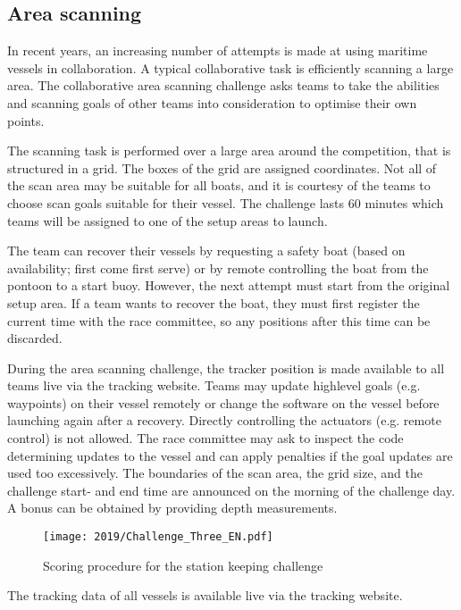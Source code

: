 \documentclass[12pt]{article}
\begin{document}
\subsection{Area scanning}
In recent years, an increasing number of attempts is made at using maritime
vessels in collaboration. A typical
collaborative task is efficiently scanning a large area.
The collaborative area scanning challenge asks teams to take the abilities and
scanning goals of other teams into consideration to optimise their own points.

The scanning task is performed over a large area around the competition, that is
structured in a grid. The boxes of the grid are assigned coordinates. Not all of
the scan area may be suitable for all boats, and it is courtesy of the teams to
choose scan goals suitable for their vessel. The
challenge lasts 60 minutes which teams will be assigned to one of the setup areas
to launch. 

The team can recover their vessels by requesting a safety boat (based on
availability; first come first serve) or by remote controlling the boat from the
pontoon to a start buoy. However, the next attempt must start from the original setup area.
If a team wants to recover the boat, they must first
register the current time with the race committee, so any positions after this
time can be discarded.

During the area scanning challenge, the tracker position is made available 
to all teams live via the tracking website. Teams may update 
highlevel goals (e.g. waypoints) on their vessel remotely or change the software
on the vessel before launching again after a recovery.
Directly controlling the
actuators (e.g. remote control) is not allowed. The race committee may ask to
inspect the code determining updates to the vessel and can apply penalties if
the goal updates are used too excessively.
The boundaries of the scan area, the grid size, and the challenge start- and end time
are announced on the morning of the challenge day.
A bonus can be obtained by providing depth measurements.

\begin{figure}[H]
  \centering
  \texttt{[image: 2019/Challenge\_Three\_EN.pdf]}
  \caption{Scoring procedure for the station keeping challenge}
  \label{fig:stationkeeping}
\end{figure}


The tracking data of all vessels is available live via the tracking website.
\end{document}
